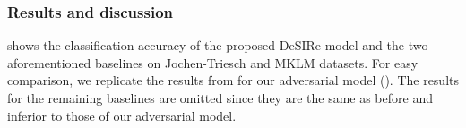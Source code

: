 \subsubsection{Results and discussion}


 shows the classification accuracy of the proposed DeSIRe model and the two aforementioned baselines on Jochen-Triesch and MKLM datasets. For easy comparison, we replicate the results from  for our adversarial model (). The results for the remaining baselines are omitted since they are the same as before and inferior to those of our adversarial model.

\begin{table}[t]
    \centering
    \caption{Classification accuracy (\%) of DeSIRe and baselines on Jochen-Triesch and MKLM datasets.}
    \label{tab:desire_jt_mklm_results}
\end{table}

